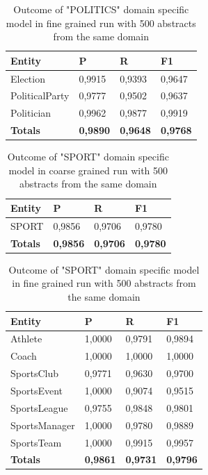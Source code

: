 \documentclass[thesis=M,english]{FITthesis}[2018/05/30]
\begin{document}
	\begin{table}[H]\centering
		\begin{tabular}{|l|l|l|l|}
			\hline {\textbf{Entity}} & {\textbf{P}} & {\textbf{R}} & {\textbf{F1}}\\\hline
				Election & 0,9915 & 0,9393 & 0,9647\\
				PoliticalParty & 0,9777 & 0,9502 & 0,9637\\
				Politician & 0,9962 & 0,9877 & 0,9919\\\hline
				\textbf{Totals} & \textbf{0,9890} & \textbf{0,9648} & \textbf{0,9768}\\\hline
		\end{tabular}
		\caption{Outcome of "POLITICS" domain specific model in fine grained run with 500 abstracts from the same domain \label{table:500PoliticsDomainWithPoliticsTop500Fine}}
	\end{table}	
	

	\begin{table}[H]\centering
		\begin{tabular}{|l|l|l|l|}
			\hline {\textbf{Entity}} & {\textbf{P}} & {\textbf{R}} & {\textbf{F1}}\\\hline
				SPORT & 0,9856 & 0,9706 & 0,9780\\\hline
				\textbf{Totals} & \textbf{0,9856} & \textbf{0,9706} & \textbf{0,9780}\\\hline
		\end{tabular}
		\caption{Outcome of "SPORT" domain specific model in coarse grained run with 500 abstracts from the same domain \label{table:500SportDomainWithSportTop500Coarse}}
	\end{table}

	\begin{table}[H]\centering
		\begin{tabular}{|l|l|l|l|}
			\hline {\textbf{Entity}} & {\textbf{P}} & {\textbf{R}} & {\textbf{F1}}\\\hline
				Athlete & 1,0000 & 0,9791 & 0,9894\\
				Coach & 1,0000 & 1,0000 & 1,0000\\
				SportsClub & 0,9771 & 0,9630 & 0,9700\\
				SportsEvent & 1,0000 & 0,9074 & 0,9515\\
				SportsLeague & 0,9755 & 0,9848 & 0,9801\\
				SportsManager & 1,0000 & 0,9780 & 0,9889\\				
				SportsTeam & 1,0000 & 0,9915 & 0,9957\\\hline
				\textbf{Totals} & \textbf{0,9861} & \textbf{0,9731} & \textbf{0,9796}\\\hline
		\end{tabular}
		\caption{Outcome of "SPORT" domain specific model in fine grained run with 500 abstracts from the same domain \label{table:500SportDomainWithSportTop500Fine}}
	\end{table}	
\end{document}
